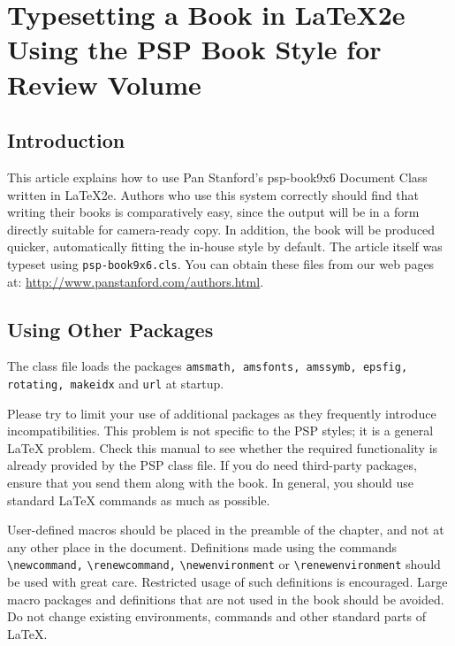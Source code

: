 \chapter[Typesetting a Book in \LaTeX2e Using the PSP Book Style]
{Typesetting a Book in \LaTeX2e\\ Using the PSP Book Style for Review Volume\label{ch1}}




\section{Introduction}\label{sec1.1}
This article explains how to  use Pan Stanford's psp-book9x6 Document
Class written in \LaTeX2e. Authors who use this system correctly
should find that writing their books is comparatively easy, since
the output will be in a form directly suitable for camera-ready
copy. In addition, the book will be produced quicker, automatically
fitting the in-house style by default. The article itself was
typeset using \verb|psp-book9x6.cls|. You can obtain these files
from our web pages at:
\url{http://www.panstanford.com/authors.html}.\vfill



\section{Using Other Packages}\label{sec1.2}
The class file loads the packages {\tt amsmath, amsfonts, amssymb,
epsfig, rotating, makeidx} and \verb|url| at startup.

Please try to limit your use of additional packages
as they frequently introduce incompatibilities. This problem is not
specific to the PSP styles; it is a general \LaTeX{} problem. Check
this manual to see whether the required functionality is already
provided by the PSP class file. If you do need third-party packages,
ensure that you send them along with the book. In general, you
should use standard \LaTeX{} commands as much as possible.

User-defined macros should be placed in the preamble of the chapter,
and not at any other place in the document. Definitions made using
the commands \verb|\newcommand,| \verb|\renewcommand,|
\verb|\newenvironment| or \verb|\renewenvironment| should be used
with great care. Restricted usage of such definitions is encouraged.
Large macro packages and definitions that are not used in the book
should be avoided. Do not change existing environments, commands and
other standard parts of \LaTeX.

